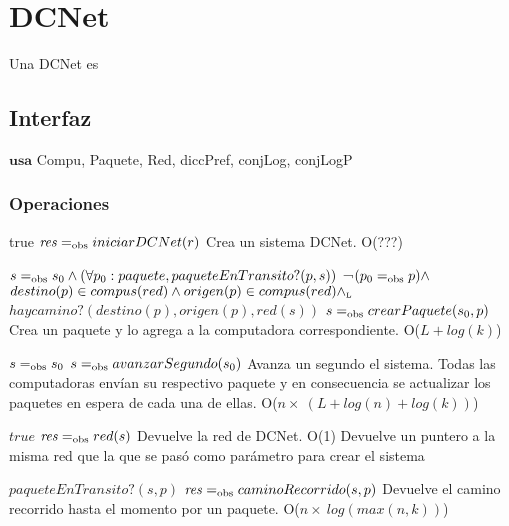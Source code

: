 
\section{DCNet}

Una DCNet es

\subsection{Interfaz}

$\textbf{usa}$  
Compu, Paquete, Red, diccPref, conjLog, conjLogP


\subsubsection*{Operaciones}


 {true}
 {$\text{\textit{res}} =_{\mathrm{obs}} iniciarDCNet(r)$}
 {Crea un sistema DCNet.}
 {O(???)}

 {$s =_{\mathrm{obs}} s_0 \land (\forall p_0:paquete,paqueteEnTransito?(p,s))$ ¬$(p_0 =_{\mathrm{obs}} p) \land$ \\ $destino(p) \in compus(red) \land origen(p) \in compus(red) \land_{\mathrm{\scriptscriptstyle{L}}} $ \\ $haycamino?(destino(p),origen(p),red(s))$}
 {$s =_{\mathrm{obs}} crearPaquete(s_0, p)$}
 {Crea un paquete y lo agrega a la computadora correspondiente.}
 {O($L + log(k)$)}

 {$s =_{\mathrm{obs}} s_0$}
 {$s =_{\mathrm{obs}} avanzarSegundo(s_0)$}
 {Avanza un segundo el sistema. Todas las computadoras envían su respectivo paquete y en consecuencia se actualizar los paquetes en espera de cada una de ellas.}
 {O($n \times\ (L + log(n) + log(k))$)}

 {$true$}
 {$\text{\textit{res}} =_{\mathrm{obs}} red(s)$}
 {Devuelve la red de DCNet.}
 {O(1)}
 {Devuelve un puntero a la misma red que la que se pas\'o como par\'ametro para crear el sistema}

 {$paqueteEnTransito?(s,p)$}
 {$\text{\textit{res}} =_{\mathrm{obs}} caminoRecorrido(s,p)$}
 {Devuelve el camino recorrido hasta el momento por un paquete.}
 {O($n \times\  log(max(n,k))$)}


